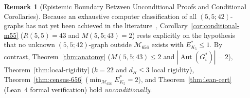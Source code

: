 \documentclass[11pt,a4paper]{article}
\theoremstyle{plain}
\theoremstyle{definition}
\newtheorem{remark}[theorem]{Remark}
\DeclareMathOperator{\Aut}{Aut}
\begin{document}
\begin{remark}[Epistemic Boundary Between Unconditional Proofs and Conditional Corollaries]\label{rem:boundary}
Because an exhaustive computer classification of all $(5,5;42)$-graphs has not yet been achieved in the literature~\cite{McKayRadziszowski1997,RadziszowskiSurvey}, Corollary~\ref{cor:conditional-m55} ($R(5,5)=43$ and $M(5,5;43)=2$) rests explicitly on the hypothesis that no unknown $(5,5;42)$-graph outside $\mathcal{M}_{656}$ exists with $E_{K_5}^* \le 1$. By contrast, Theorem~\ref{thm:anatomy} ($M(5,5;43) \le 2$ and $|\Aut(G^*_i)| = 2$), Theorem~\ref{thm:local-rigidity} ($k=22$ and $d_H \le 3$ local rigidity), Theorem~\ref{thm:census-656} ($\min_{\mathcal{M}_{656}} E_{K_5}^* = 2$), and Theorem~\ref{thm:lean-cert} (Lean~4 formal verification) hold \emph{unconditionally}.
\end{remark}
\end{document}

